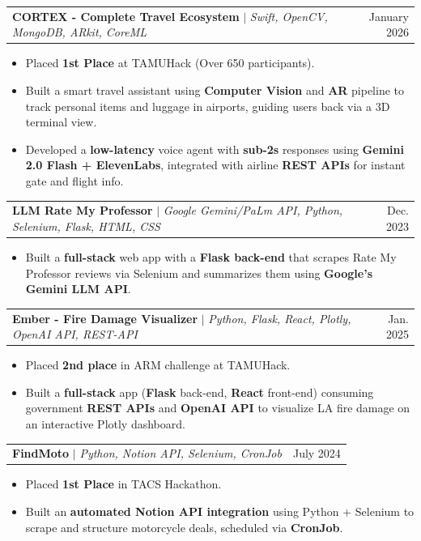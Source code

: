 \documentclass[letterpaper,10pt]{article}
\makeatletter
\newcommand{\resumeItem}[1]{
  \item\small{
    {#1 \vspace{-2pt}}
  }
}
\newcommand{\resumeProjectHeading}[2]{
    \item
    \begin{tabular*}{0.97\textwidth}{l@{\extracolsep{\fill}}r}
      \small#1 & #2 \\
    \end{tabular*}\vspace{-7pt}
}
\newcommand{\resumeItemListStart}{\begin{itemize}[itemsep=-2pt]}
\newcommand{\resumeItemListEnd}{\end{itemize}\vspace{-5pt}}
\makeatother
\begin{document}
    \resumeProjectHeading
          {\textbf{CORTEX - Complete Travel Ecosystem} $|$ \emph{Swift, OpenCV, MongoDB, ARkit, CoreML}}{January 2026}
          \resumeItemListStart
            \resumeItem{Placed \textbf{1st Place} at TAMUHack (Over 650 participants).}
            \resumeItem{Built a smart travel assistant using \textbf{Computer Vision} and \textbf{AR} pipeline to track personal items and luggage in airports, guiding users back via a 3D terminal view.}
            \resumeItem{Developed a \textbf{low-latency} voice agent with \textbf{sub-2s} responses using \textbf{Gemini 2.0 Flash + ElevenLabs}, integrated with airline \textbf{REST APIs} for instant gate and flight info.}
          \resumeItemListEnd

    \resumeProjectHeading
          {\textbf{LLM Rate My Professor} $|$ \emph{Google Gemini/PaLm API, Python, Selenium, Flask, HTML, CSS}}{Dec. 2023}
          \resumeItemListStart
            \resumeItem{Built a \textbf{full-stack} web app with a \textbf{Flask back-end} that scrapes Rate My Professor reviews via Selenium and summarizes them using \textbf{Google's Gemini LLM API}.}
          \resumeItemListEnd

    \resumeProjectHeading
    {\textbf{Ember - Fire Damage Visualizer} $|$ \emph{Python, Flask, React, Plotly, OpenAI API, REST-API}}{Jan. 2025}
    \resumeItemListStart
      \resumeItem{Placed \textbf{2nd place} in ARM challenge at TAMUHack.}
      \resumeItem{Built a \textbf{full-stack} app (\textbf{Flask} back-end, \textbf{React} front-end) consuming government \textbf{REST APIs} and \textbf{OpenAI API} to visualize LA fire damage on an interactive Plotly dashboard.}
    \resumeItemListEnd


    \resumeProjectHeading
          {\textbf{FindMoto} $|$ \emph{Python, Notion API, Selenium, CronJob}}{July 2024}
          \resumeItemListStart
            \resumeItem{Placed \textbf{1st Place} in TACS Hackathon.}
            \resumeItem{Built an \textbf{automated Notion API integration} using Python + Selenium to scrape and structure motorcycle deals, scheduled via \textbf{CronJob}.}
          \resumeItemListEnd


    

\end{document}
